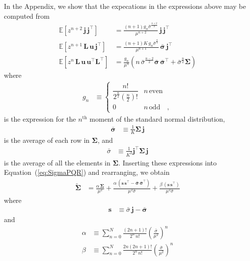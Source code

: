 \documentclass[modern]{aastex62}
\begin{document}
%
In the Appendix, we show that the expecations in the expressions above may be computed from
%
\begin{align}
    \mathbb{E}\left[
        z^{n + 2} \, \mathbf{j} \, \mathbf{j}^\top
        \right]
     & =
    \frac{(n + 1) g_{n} \bar{\sigma}^\frac{n+2}{2}}{\mu^{n+2}} \, \mathbf{j} \, \mathbf{j}^\top
    \\[0.5em]
    \mathbb{E}\left[
        z^{n + 1} \, \mathbf{L} \, \mathbf{u} \, \mathbf{j}^\top
        \right]
     & =
    \frac{(n + 1) K \, g_{n} \bar{\sigma}^\frac{n}{2}}{\mu^{n+1}} \, \bar{\pmb{\sigma}} \, \mathbf{j}^\top
    \\[0.5em]
    \mathbb{E}\left[
        z^n \, \mathbf{L} \, \mathbf{u} \, \mathbf{u}^\top \mathbf{L}^\top
        \right]
     & =
    \frac{g_n}{\mu^n} \left(
    n \,  \bar{\sigma}^\frac{n - 2}{2} \bar{\pmb{\sigma}} \, \bar{\pmb{\sigma}}^\top + \bar{\sigma}^\frac{n}{2} \pmb{\Sigma}
    \right)
\end{align}
%
where
%
\begin{align}
    g_n
     & \equiv
    \begin{cases}
        \dfrac{n!}{2^\frac{n}{2} \left(\frac{n}{2}\right)!} & n \, \mathrm{even}
        \\
        0                                                   & n \, \mathrm{odd}
        \quad,
    \end{cases}
\end{align}
%
is the expression for the $n^\mathrm{th}$ moment of the standard normal distribution,
%
\begin{align}
    \bar{\pmb{\sigma}}
     & \equiv
    \frac{1}{K} \pmb{\Sigma} \, \mathbf{j}
\end{align}
%
is the average of each row in $\pmb{\Sigma}$, and
%
\begin{align}
    \bar{\sigma}
     & \equiv
    \frac{1}{K^2} \mathbf{j}^\top \pmb{\Sigma} \, \mathbf{j}
\end{align}
%
is the average of all the elements in $\pmb{\Sigma}$.
%
Inserting these expressions into Equation~(\ref{eq:SigmaPQR}) and rearranging, we obtain
%
\begin{align}
    \tilde{\pmb{\Sigma}}
     & =
    \frac{\alpha \, \pmb{\Sigma}}{\mu^2}  +
    \frac{\alpha \, \left(\mathbf{s} \, \mathbf{s}^\top - \bar{\pmb{\sigma}} \, \bar{\pmb{\sigma}}^\top\right)}{\mu^2 \bar{\sigma}}  +
    \frac{\beta \, \left(\mathbf{s} \, \mathbf{s}^\top\right)}{\mu^2 \bar{\sigma}}
\end{align}
%
where
%
\begin{align}
    \mathbf{s}
     & \equiv
    \bar{\sigma} \, \mathbf{j} - \bar{\pmb{\sigma}}
\end{align}
%
and
%
\begin{align}
    \alpha
     & \equiv
    \sum\limits_{n=0}^N
    \frac{(2n + 1)!}{2^n \, n!}
    \left(
    \frac{\bar{\sigma}}{\mu^2}
    \right)^n
    \\[1em]
    \beta
     & \equiv
    \sum\limits_{n=0}^N
    \frac{2n(2n + 1)!}{2^n \, n!}
    \left(
    \frac{\bar{\sigma}}{\mu^2}
    \right)^n
\end{align}
%
\end{document}

